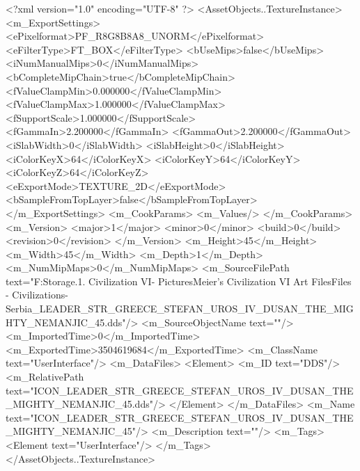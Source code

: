 <?xml version="1.0" encoding="UTF-8" ?>
<AssetObjects..TextureInstance>
	<m_ExportSettings>
		<ePixelformat>PF_R8G8B8A8_UNORM</ePixelformat>
		<eFilterType>FT_BOX</eFilterType>
		<bUseMips>false</bUseMips>
		<iNumManualMips>0</iNumManualMips>
		<bCompleteMipChain>true</bCompleteMipChain>
		<fValueClampMin>0.000000</fValueClampMin>
		<fValueClampMax>1.000000</fValueClampMax>
		<fSupportScale>1.000000</fSupportScale>
		<fGammaIn>2.200000</fGammaIn>
		<fGammaOut>2.200000</fGammaOut>
		<iSlabWidth>0</iSlabWidth>
		<iSlabHeight>0</iSlabHeight>
		<iColorKeyX>64</iColorKeyX>
		<iColorKeyY>64</iColorKeyY>
		<iColorKeyZ>64</iColorKeyZ>
		<eExportMode>TEXTURE_2D</eExportMode>
		<bSampleFromTopLayer>false</bSampleFromTopLayer>
	</m_ExportSettings>
	<m_CookParams>
		<m_Values/>
	</m_CookParams>
	<m_Version>
		<major>1</major>
		<minor>0</minor>
		<build>0</build>
		<revision>0</revision>
	</m_Version>
	<m_Height>45</m_Height>
	<m_Width>45</m_Width>
	<m_Depth>1</m_Depth>
	<m_NumMipMaps>0</m_NumMipMaps>
	<m_SourceFilePath text="F:\Mod Storage\2.1. Civilization VI\Mods\Archive - Pictures\Sid Meier's Civilization VI Art Files\Art Files - Civilizations\Civilization - Serbia\ICON_LEADER_STR_GREECE_STEFAN_UROS_IV_DUSAN_THE_MIGHTY_NEMANJIC_45.dds"/>
	<m_SourceObjectName text=""/>
	<m_ImportedTime>0</m_ImportedTime>
	<m_ExportedTime>3504619684</m_ExportedTime>
	<m_ClassName text="UserInterface"/>
	<m_DataFiles>
		<Element>
			<m_ID text="DDS"/>
			<m_RelativePath text="ICON_LEADER_STR_GREECE_STEFAN_UROS_IV_DUSAN_THE_MIGHTY_NEMANJIC_45.dds"/>
		</Element>
	</m_DataFiles>
	<m_Name text="ICON_LEADER_STR_GREECE_STEFAN_UROS_IV_DUSAN_THE_MIGHTY_NEMANJIC_45"/>
	<m_Description text=""/>
	<m_Tags>
		<Element text="UserInterface"/>
	</m_Tags>
</AssetObjects..TextureInstance>

